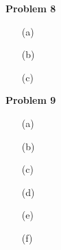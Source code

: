 \documentclass[11pt]{article}
\begin{document}
    \begin{center}
        \Large
        \textbf{Problem 8}
    \end{center}
    \normalsize
    \begin{enumerate}
        \item[(a)] %
        \item[(b)] %
        \item[(c)] %
    \end{enumerate}

    \begin{center}
        \Large
        \textbf{Problem 9}
    \end{center}
    \normalsize
    \begin{enumerate}
        \item[(a)] %
        \item[(b)] %
        \item[(c)] %
        \item[(d)] %
        \item[(e)] %
        \item[(f)] %
    \end{enumerate}
\end{document}

